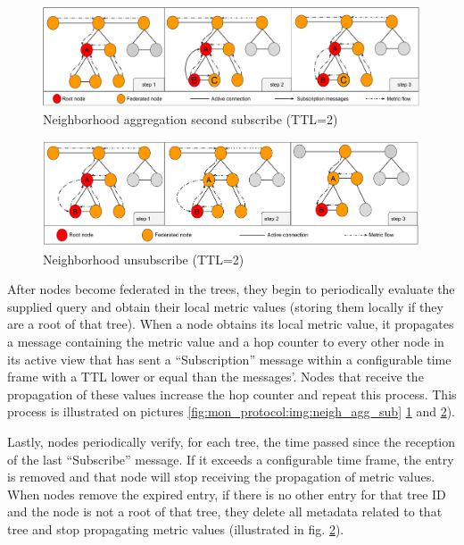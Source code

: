 \begin{figure}[htbp]
    \centering
    \includegraphics[width=\textwidth]{Chapters/aggregation/images/2nd_subscribe.pdf}
    \caption{Neighborhood aggregation second subscribe (TTL=2)}
    \label{fig:mon_protocol:img:neigh_agg_second_sub}
\end{figure}


\begin{figure}[htbp]
    \centering
    \includegraphics[width=\textwidth]{Chapters/aggregation/images/unsubscribe_process.pdf}
    \caption{Neighborhood unsubscribe (TTL=2)}
    \label{fig:mon_protocol:img:neigh_agg_unsub}
\end{figure}

After nodes become federated in the trees, they begin to periodically evaluate the supplied query and obtain their local metric values (storing them locally if they are a root of that tree). When a node obtains its local metric value, it propagates a message containing the metric value and a hop counter to every other node in its active view that has sent a ``Subscription'' message within a configurable time frame with a TTL lower or equal than the messages'. Nodes that receive the propagation of these values increase the hop counter and repeat this process. This process is illustrated on pictures \ref{fig:mon_protocol:img:neigh_agg_sub} \ref{fig:mon_protocol:img:neigh_agg_second_sub} and \ref{fig:mon_protocol:img:neigh_agg_unsub}). 
    
Lastly, nodes periodically verify, for each tree, the time passed since the reception of the last ``Subscribe'' message. If it exceeds a configurable time frame, the entry is removed and that node will stop receiving the propagation of metric values. When nodes remove the expired entry, if there is no other entry for that tree ID and the node is not a root of that tree, they delete all metadata related to that tree and stop propagating metric values (illustrated in fig. \ref{fig:mon_protocol:img:neigh_agg_unsub}).

